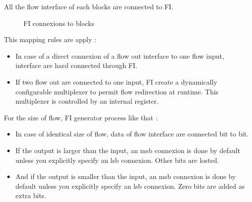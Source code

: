 All the flow interface of each blocks are connected to FI.

\begin{figure}[h!]
\centering
{}
\caption{FI connexions to blocks}
\end{figure}

This mapping rules are apply :
\begin{itemize}
\item In case of a direct connexion of a flow out interface to one flow input, interface are hard connected through FI.
\item If two flow out are connected to one input, FI create a dynamically configurable multiplexer to permit flow redirection at runtime. This multiplexer is controlled by an internal register.
\end{itemize}

For the size of flow, FI generator process like that :
\begin{itemize}
\item In case of identical size of flow, data of flow interface are connected bit to bit.
\item If the output is larger than the input, an msb connexion is done by default unless you explicitly specify an lsb connexion. Other bits are losted.
\item And if the output is smaller than the input, an msb connexion is done by default unless you explicitly specify an lsb connexion. Zero bits are added as extra bits.
\end{itemize}

